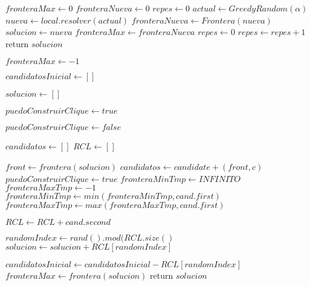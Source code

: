 \begin{algorithm}[H]
\begin{algorithmic}
	\State $fronteraMax \gets 0$
	\State $fronteraNueva \gets 0$
	\State $repes \gets 0$
        \State $actual \gets GreedyRandom(\alpha)$
    	\State $nueva \gets local.resolver(actual)$
    	\State $fronteraNueva \gets Frontera(nueva)$
    		\State $solucion \gets nueva$
    		\State $fronteraMax \gets fronteraNueva$
            \State $repes \gets 0$
    	\Else 
    		\State $repes \gets repes + 1$
    	\EndIf
    \EndWhile
    \State return $solucion$
\EndFunction
\end{algorithmic}
\end{algorithm}


\begin{algorithm}[H]
\begin{algorithmic}
    \State $fronteraMax \gets -1$

    \State $candidatosInicial \gets []$

    \State $solucion \gets []$

    \State $puedoConstruirClique \gets true$

        \State $puedoConstruirClique \gets false$

        \State $candidatos \gets []$
        \State $RCL \gets []$

                \State $front \gets frontera(solucion)$
                \State $candidatos \gets candidate + (front, c)$
                \State $puedoConstruirClique \gets true$
            \EndIf
        \EndFor
        \State $fronteraMinTmp \gets INFINITO$
        \State $fronteraMaxTmp \gets -1$
            \State $fronteraMinTmp \gets min(fronteraMinTmp, cand.first)$
            \State $fronteraMaxTmp \gets max(fronteraMaxTmp, cand.first)$
        \EndFor

                \State $RCL \gets RCL + cand.second$
            \EndIf
        \EndFor

            \State $randomIndex \gets rand().mod(RCL.size()$
            \State $solucion \gets solucion + RCL[randomIndex]$

            \State $candidatosInicial \gets candidatosInicial - RCL[randomIndex]$
        \EndIf
    \EndWhile
    \State $fronteraMax \gets frontera(solucion)$
    \State return $solucion$
\EndFunction
\end{algorithmic}
\end{algorithm}


